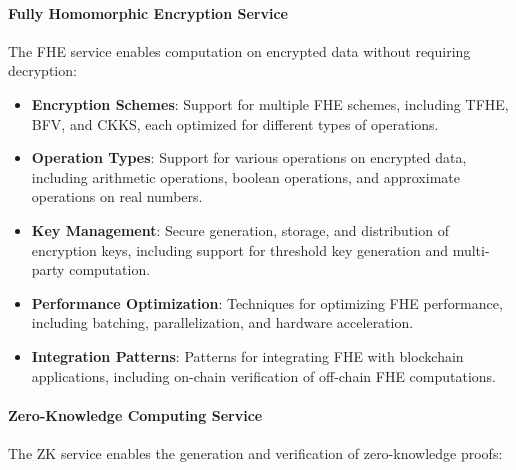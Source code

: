 \documentclass{article}
\begin{document}
\paragraph{Fully Homomorphic Encryption Service}
The FHE service enables computation on encrypted data without requiring decryption:

\begin{itemize}
    \item \textbf{Encryption Schemes}: Support for multiple FHE schemes, including TFHE, BFV, and CKKS, each optimized for different types of operations.
    
    \item \textbf{Operation Types}: Support for various operations on encrypted data, including arithmetic operations, boolean operations, and approximate operations on real numbers.
    
    \item \textbf{Key Management}: Secure generation, storage, and distribution of encryption keys, including support for threshold key generation and multi-party computation.
    
    \item \textbf{Performance Optimization}: Techniques for optimizing FHE performance, including batching, parallelization, and hardware acceleration.
    
    \item \textbf{Integration Patterns}: Patterns for integrating FHE with blockchain applications, including on-chain verification of off-chain FHE computations.
\end{itemize}

\paragraph{Zero-Knowledge Computing Service}
The ZK service enables the generation and verification of zero-knowledge proofs:
\end{document}
